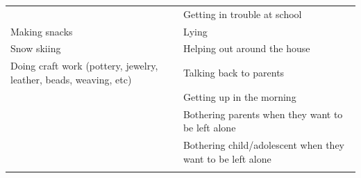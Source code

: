 \documentclass[
]{book}
\begin{document}
\begin{longtable}[]{@{}ll@{}}
\begin{minipage}[t]{0.50\columnwidth}
\end{minipage} & \begin{minipage}[t]{0.44\columnwidth}\raggedright
Getting in trouble at school\strut
\end{minipage}\tabularnewline
\begin{minipage}[t]{0.50\columnwidth}\raggedright
Making snacks\strut
\end{minipage} & \begin{minipage}[t]{0.44\columnwidth}\raggedright
Lying\strut
\end{minipage}\tabularnewline
\begin{minipage}[t]{0.50\columnwidth}\raggedright
Snow skiing\strut
\end{minipage} & \begin{minipage}[t]{0.44\columnwidth}\raggedright
Helping out around the house\strut
\end{minipage}\tabularnewline
\begin{minipage}[t]{0.50\columnwidth}\raggedright
Doing craft work (pottery, jewelry, leather, beads, weaving, etc)\strut
\end{minipage} & \begin{minipage}[t]{0.44\columnwidth}\raggedright
Talking back to parents\strut
\end{minipage}\tabularnewline
\begin{minipage}[t]{0.50\columnwidth}\raggedright
\strut
\end{minipage} & \begin{minipage}[t]{0.44\columnwidth}\raggedright
Getting up in the morning\strut
\end{minipage}\tabularnewline
\begin{minipage}[t]{0.50\columnwidth}\raggedright
\strut
\end{minipage} & \begin{minipage}[t]{0.44\columnwidth}\raggedright
Bothering parents when they want to be left alone\strut
\end{minipage}\tabularnewline
\begin{minipage}[t]{0.50\columnwidth}\raggedright
\strut
\end{minipage} & \begin{minipage}[t]{0.44\columnwidth}\raggedright
Bothering child/adolescent when they want to be left alone\strut
\end{minipage}\tabularnewline
\begin{minipage}[t]{0.50\columnwidth}\raggedright
\strut
\end{minipage} & \begin{minipage}[t]{0.44\columnwidth}\raggedright

\end{minipage}
\end{longtable}
\end{document}

